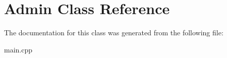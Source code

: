 \hypertarget{class_admin}{}\section{Admin Class Reference}
\label{class_admin}


The documentation for this class was generated from the following file\+:\begin{DoxyCompactItemize}
\item 
main.\+cpp\end{DoxyCompactItemize}
